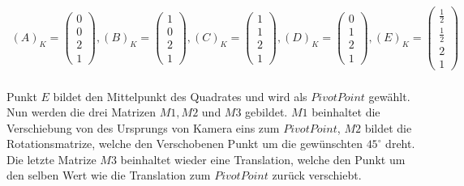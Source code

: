 \begin{gather}
(A)_K=\begin{pmatrix}
0\\0\\2\\1
\end{pmatrix}, 
(B)_K=
\begin{pmatrix}
1\\0\\2\\1
\end{pmatrix},
(C)_K=
\begin{pmatrix}
1\\1\\2\\1
\end{pmatrix},
(D)_K=
\begin{pmatrix}
0\\1\\2\\1
\end{pmatrix},
(E)_K=
\begin{pmatrix}
\frac{1}{2}\\\frac{1}{2}\\2\\1
\end{pmatrix}
\end{gather}\\

Punkt $E$ bildet den Mittelpunkt des Quadrates und wird als $PivotPoint$ gewählt. Nun werden die drei Matrizen $M1, M2$ und $M3$ gebildet. $M1$ beinhaltet die Verschiebung von des Ursprungs von Kamera eins zum $PivotPoint$, $M2$ bildet die Rotationsmatrize, welche den Verschobenen Punkt um die gewünschten $45^\circ$ dreht. Die letzte Matrize $M3$ beinhaltet wieder eine Translation, welche den Punkt um den selben Wert wie die Translation zum $PivotPoint$ zurück verschiebt. 

